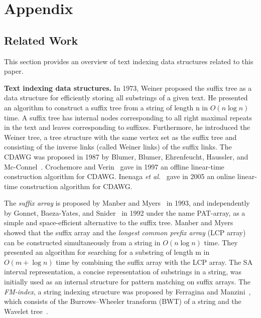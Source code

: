 \section{Appendix}

\subsection{Related Work}

This section provides an overview of text indexing data structures related to this paper. 

\textbf{Text indexing data structures.} In 1973, Weiner \cite{weiner1973linear} proposed the suffix tree as a data structure for efficiently storing all substrings of a given text. He presented an algorithm to construct a suffix tree from a string of length n in $O(n \log n)$ time. A suffix tree has internal nodes corresponding to all right maximal repeats in the text and leaves corresponding to suffixes. Furthermore, he introduced the Weiner tree, a tree structure with the same vertex set as the suffix tree and consisting of the inverse links (called Weiner links) of the suffix links.
The CDAWG was proposed in 1987 by Blumer, Blumer, Ehrenfeucht, Haussler, and Mc-Connel~\cite{blumer1987complete}. Crochemore and Verin~\cite{crochemore:verin1997compact} gave in 1997 an offline linear-time construction algorithm for CDAWG. Inenaga \textit{et al.}~\cite{inenaga2005online} gave in 2005 an online linear-time construction algorithm for CDAWG.

The \textit{suffix array} is proposed by Manber and Myers~\cite{ManberM93:SA} in 1993, and independently by Gonnet, Baeza-Yates, and Snider~\cite{gonnet1992patarray} in 1992 under the name PAT-array, as a simple and space-efficient alternative to the suffix tree. Manber and Myers~\cite{ManberM93:SA} showed that the suffix array and the \textit{longest common prefix array} (LCP array) can be constructed simultaneously from a string in $O(n \log n)$ time. They presented an algorithm for searching for a substring of length m in $O(m+ \log n)$ time by combining the suffix array with the LCP array. The SA interval representation, a concise representation of substrings in a string, was initially used as an internal structure for pattern matching on suffix arrays.
The \textit{FM-index}, a string indexing structure was proposed by Ferragina and Manzini~\cite{Ferragina05:FM}, which consists of the Burrows–Wheeler transform (BWT) of a string and the Wavelet tree~\cite{grossi2003high}. 

